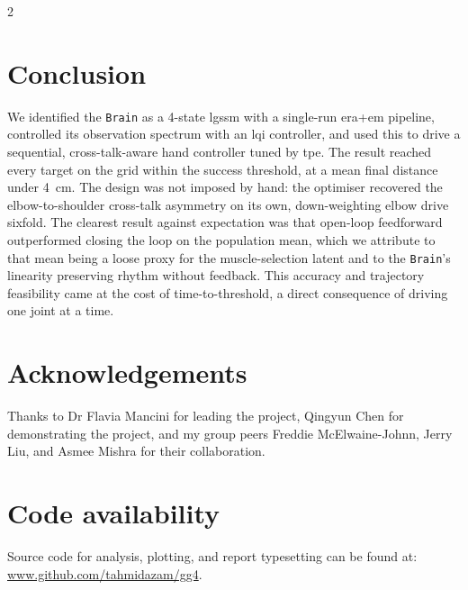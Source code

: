 \documentclass[a4paper, 10pt]{article}
\newcommand{\Brain}{\texttt{Brain}\xspace}
\newcommand{\LGSSM}{\ac{lgssm}\xspace}
\newcommand{\LQI}{\ac{lqi}\xspace}
\begin{document}
\begin{multicols*}{2}
  \section*{Conclusion}

  We identified the \Brain as a 4-state \LGSSM with a single-run
  \ac{era}+\ac{em} pipeline, controlled its observation spectrum with an \LQI
  controller, and used this to drive a sequential, cross-talk-aware hand
  controller tuned by \ac{tpe}. The result reached every target on the grid
  within the success threshold, at a mean final distance under \SI{4}{cm}. The
  design was not imposed by hand: the optimiser recovered the elbow-to-shoulder
  cross-talk asymmetry on its own, down-weighting elbow drive sixfold. The
  clearest result against expectation was that open-loop feedforward outperformed
  closing the loop on the population mean, which we attribute to that mean being
  a loose proxy for the muscle-selection latent and to the \Brain's linearity
  preserving rhythm without feedback. This accuracy and trajectory feasibility
  came at the cost of time-to-threshold, a direct consequence of driving one
  joint at a time.

  \section*{Acknowledgements}

  Thanks to Dr Flavia Mancini for leading the project, Qingyun Chen for
  demonstrating the project, and my group peers Freddie McElwaine-Johnn, Jerry
  Liu, and Asmee Mishra for their collaboration.

  \section*{Code availability}

  Source code for analysis, plotting, and report typesetting can be found at:
  \href{https://www.github.com/tahmidazam/gg4}{www.github.com/tahmidazam/gg4}.

  \printbibheading
  \renewcommand{\bibfont}{\footnotesize}
  \printbibliography[heading=none]
\end{multicols*}
\end{document}
